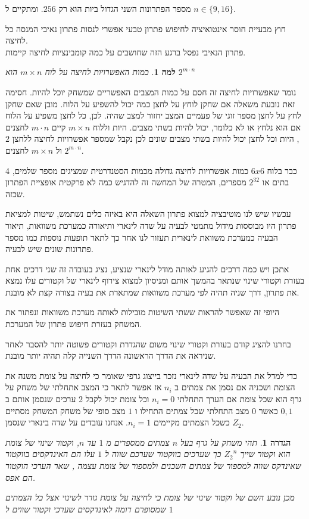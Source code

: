 \documentclass[12pt,twoside]{article}
\newtheorem{definition}{הגדרה}[section]
\newtheorem{lemma}{למה}[section]
\newcommand{\Zn}{{Z_2}^n}
\begin{document}
מספר הפתרונות השני הגדול ביות הוא רק
$256$.
ומתקיים ל
$n \in \{9, 16 \}$.

חוץ מבעיית חוסר אינטואיציה לחיפוש פתרון טבעי אפשרי לנסות
פתרון נאיבי המנסה כל לחיצה.
\\
פתרון הנאיבי נפסל ברגע הזה שחושבים על כמה קומבינציות לחיצה קיימות.

\begin{lemma}
    כמות האפשרויות לחיצה על לוח
    $m \times n$
    הוא 
    $2^{m \cdot n}$
\end{lemma}
נומר שאפשרויות לחיצה זה חסם על כמות המצבים האפשריים שמשחק יוכל להיות.
חסימה זאת נובעת משאלה אם שחקן לוחץ על לחצן כמה יכול להשפיע על הלוח.
מובן שאם שחקן לחץ על לחצן מספר זוגי של פעמיים המצב יחזור למצב שהיה.
לכן,
כל לחצן משפיע על הלוח אם הוא נלחץ או לא כלומר, יכול להיות בשתי מצבים.
היות וללוח
$m \times n$
קיים 
$m \cdot n$
לחצנים
,
היות וכל לחצן 
יכול להיות בשתי מצבים שונים
לכן נקבל 
שמספר אפשרויות לחיצה 
ללחצן 
$2$
ול
$m \times n$
לחצנים
$2^{m \cdot n}$.

כבר בלוח 
$6x6$
כמות  אפשרויות לחיצה גדולה 
מכמות הסטנדרטית שמציגים מספר שלמים,
4 בתים או 
$2^{32}$
מספרים,
המטרה של המחשה זה להדגיש כמה לא פרקטית אופציית הפתרון שכזה.

עכשיו שיש לנו מוטיבציה למצוא פתרון השאלה היא באיזה כלים נשתמש, שיטות למציאת פתרון היו מבוססות
מידול מתמטי לבעיה על שדה לינארי ותיאורה כמערכת משוואות, תיאור הבעיה
כמערכת משוואת לינארית תעזור לנו אחר כך לתאר תופעות נוספות כמו מספר פתרונות שונים
שיש לבעיה.

אתכן ויש כמה דרכים להגיע לאותה מודל לינארי שנציע, נציג בעובדה זה שני דרכים אחת 
בעזרת וקטורי שינוי שנתאר בהמשך אותם ומניסיון למצוא צירוף לינארי של וקטורים עלו נמצא את פתרון, דרך שניה תהיה
לפי מערכת משוואות שמתארת את בעיה  בצורה קצת לא מובנת.

היופי זה שאפשר להראות ששתי השיטות מובילות לאותה מערכת משוואות
ונפתור את המשחק בעזרת חיפוש פתרון של המערכת.

בחרנו להציג קודם בעזרת וקטורי שינוי משום שהגדרת וקטורים פשוטה יותר להסבר לאחר שניראה את הדרך הראשונה
הדרך השנייה קלה תהיה יותר מובנת.

כדי למדל את הבעיה על שדה לינארי נזכר בייצוג גרפי שאומר כי לחיצה על צומת משנה את הצומת ושכניה 
אם נסמן את צמתים ב
$n_i$
אז אפשר לתאר כי המצב אתחלתי של משחק על גרף הוא שכל צומת אם הערך התחלתי
$n_i = 0$
וכל צומת יכול לקבל 2 ערכים שנסמן אותם ב
${0,1}$
כאשר 
$0$
מצב התחלתי שכל צמתים התחילו 
ו
$1$
מצב סופי של משחק 
המשחק מסתיים כשכל הצמתים מקיימים
$n_i = 1$.
אנחנו עובדים על שדה בינארי
שנסמן
$Z_2$.

\begin{definition}
    תהי 
    משחק על גרף בעל
    $n$
    צמתים
    ממספרים מ
    $1$
    עד
    $n$,
    וקטור שינוי של צומת הוא 
    וקטור 
    שייך 
    $\Zn$
    כך
    שערכים בווקטור 
    שערכם שווה ל
    $1$
    עלו הם האינדקסים בווקטור 
    שאינדקס שווה למספור 
    של צמתים השכנים ולמספור של צומת עצמה
    ,
    שאר הערכי הוקטור הם אפס.

    מכן נובע השם של וקטור שינוי של צומת כי לחיצה על צומת
    גורר לשינוי אצל כל הצמתים שמסופרם דומה לאינדקסים
    שערכי וקטור שווים ל
    $1$
\end{definition}
\end{document}
